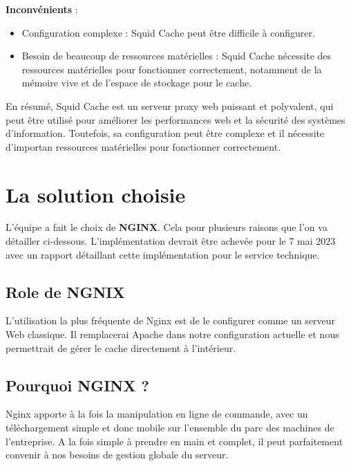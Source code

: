 \documentclass{article}
\begin{document}
\hspace{0.1cm}

{\bf Inconvénients} : \\
\begin{itemize}
    \item Configuration complexe : Squid Cache peut être difficile à configurer.\\
    
    \item Besoin de beaucoup de ressources matérielles : Squid Cache nécessite des ressources matérielles pour fonctionner correctement, notamment de la mémoire vive et de l'espace de stockage pour le cache.\\    
\end{itemize}

En résumé, Squid Cache est un serveur proxy web puissant et polyvalent, qui peut être utilisé pour améliorer les performances web et la sécurité des systèmes d'information. Toutefois, sa configuration peut être complexe et il nécessite d'importan ressources matérielles pour fonctionner correctement.

\section{La solution choisie}

L'équipe a fait le choix de {\bf NGINX}. Cela pour plusieurs raisons que l'on va détailler ci-dessous. L'implémentation devrait être achevée pour le 7 mai 2023 avec un rapport détaillant cette implémentation pour le service technique.\\ 
\subsection{Role de NGNIX}

L'utilisation la plus fréquente de Nginx est de le configurer comme un serveur Web classique. Il remplacerai Apache dans notre configuration actuelle et nous permettrait de gérer le cache directement à l'intérieur. 


\subsection{Pourquoi NGINX ?}

Nginx apporte à la fois la manipulation en ligne de commande, avec un téléchargement simple et donc mobile sur l'ensemble du parc des machines de l'entreprise.
A la fois simple à prendre en main et complet, il peut parfaitement convenir à nos besoins de gestion globale du serveur. 
\end{document}
